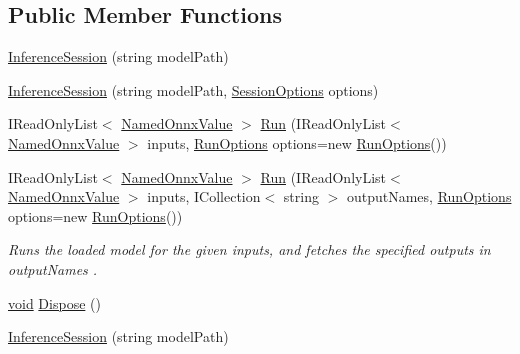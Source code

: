 \subsection*{Public Member Functions}
\begin{DoxyCompactItemize}
\item 
\mbox{\hyperlink{classMicrosoft_1_1ML_1_1OnnxRuntime_1_1InferenceSession_ad3981d9f3b4323653e5718a26af2a8c8}{Inference\+Session}} (string model\+Path)
\item 
\mbox{\hyperlink{classMicrosoft_1_1ML_1_1OnnxRuntime_1_1InferenceSession_a83d9c88f3b76f5b5011b830faab20c83}{Inference\+Session}} (string model\+Path, \mbox{\hyperlink{classMicrosoft_1_1ML_1_1OnnxRuntime_1_1SessionOptions}{Session\+Options}} options)
\item 
I\+Read\+Only\+List$<$ \mbox{\hyperlink{classMicrosoft_1_1ML_1_1OnnxRuntime_1_1NamedOnnxValue}{Named\+Onnx\+Value}} $>$ \mbox{\hyperlink{classMicrosoft_1_1ML_1_1OnnxRuntime_1_1InferenceSession_a29f708b67f43e80b2c3d11976ed91924}{Run}} (I\+Read\+Only\+List$<$ \mbox{\hyperlink{classMicrosoft_1_1ML_1_1OnnxRuntime_1_1NamedOnnxValue}{Named\+Onnx\+Value}} $>$ inputs, \mbox{\hyperlink{structMicrosoft_1_1ML_1_1OnnxRuntime_1_1RunOptions}{Run\+Options}} options=new \mbox{\hyperlink{structMicrosoft_1_1ML_1_1OnnxRuntime_1_1RunOptions}{Run\+Options}}())
\item 
I\+Read\+Only\+List$<$ \mbox{\hyperlink{classMicrosoft_1_1ML_1_1OnnxRuntime_1_1NamedOnnxValue}{Named\+Onnx\+Value}} $>$ \mbox{\hyperlink{classMicrosoft_1_1ML_1_1OnnxRuntime_1_1InferenceSession_a056db8b6717c41e7fa63fe1e5823ac96}{Run}} (I\+Read\+Only\+List$<$ \mbox{\hyperlink{classMicrosoft_1_1ML_1_1OnnxRuntime_1_1NamedOnnxValue}{Named\+Onnx\+Value}} $>$ inputs, I\+Collection$<$ string $>$ output\+Names, \mbox{\hyperlink{structMicrosoft_1_1ML_1_1OnnxRuntime_1_1RunOptions}{Run\+Options}} options=new \mbox{\hyperlink{structMicrosoft_1_1ML_1_1OnnxRuntime_1_1RunOptions}{Run\+Options}}())
\begin{DoxyCompactList}\small\item\em Runs the loaded model for the given inputs, and fetches the specified outputs in {\itshape output\+Names} . \end{DoxyCompactList}\item 
\mbox{\hyperlink{mlasi_8h_a88f941d423cb2a819b70a1358982b1a6}{void}} \mbox{\hyperlink{classMicrosoft_1_1ML_1_1OnnxRuntime_1_1InferenceSession_a2eb590b9d54dea1e8976e19bb844a7fe}{Dispose}} ()
\item 
\mbox{\hyperlink{classMicrosoft_1_1ML_1_1OnnxRuntime_1_1InferenceSession_ad3981d9f3b4323653e5718a26af2a8c8}{Inference\+Session}} (string model\+Path)

\end{DoxyCompactItemize}
